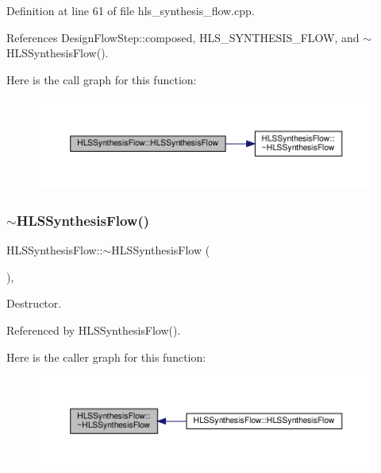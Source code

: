 Definition at line 61 of file hls\+\_\+synthesis\+\_\+flow.\+cpp.



References Design\+Flow\+Step\+::composed, H\+L\+S\+\_\+\+S\+Y\+N\+T\+H\+E\+S\+I\+S\+\_\+\+F\+L\+OW, and $\sim$\+H\+L\+S\+Synthesis\+Flow().

Here is the call graph for this function\+:
\nopagebreak
\begin{figure}[H]
\begin{center}
\leavevmode
\includegraphics[width=350pt]{dc/d92/classHLSSynthesisFlow_a1880dd0f3096c271b622fe7bf599e9a5_cgraph}
\end{center}
\end{figure}
\mbox{\label{classHLSSynthesisFlow_aec8618aa2e94de76c061ef9c62311548}} 
\subsubsection{\texorpdfstring{$\sim$\+H\+L\+S\+Synthesis\+Flow()}{~HLSSynthesisFlow()}}
{\footnotesize\ttfamily H\+L\+S\+Synthesis\+Flow\+::$\sim$\+H\+L\+S\+Synthesis\+Flow (\begin{DoxyParamCaption}{ }\end{DoxyParamCaption})\hspace{0.3cm}{\ttfamily [override]}, {\ttfamily [default]}}



Destructor. 



Referenced by H\+L\+S\+Synthesis\+Flow().

Here is the caller graph for this function\+:
\nopagebreak
\begin{figure}[H]
\begin{center}
\leavevmode
\includegraphics[width=350pt]{dc/d92/classHLSSynthesisFlow_aec8618aa2e94de76c061ef9c62311548_icgraph}
\end{center}
\end{figure}


